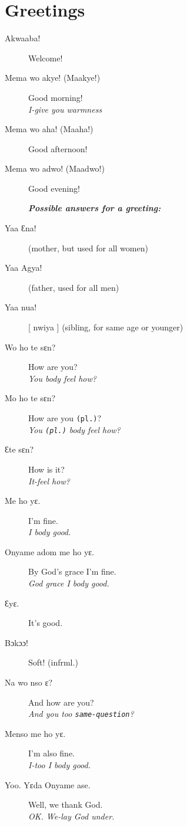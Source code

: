 \documentclass[%
 fontsize=11pt,%
 a5paper,pagesize,
 paper=a5,%
 DIV=9,%
 parskip=half*,%
 twoside=true,
 pointlessnumbers
]{scrbook}%
\begin{document}
\chapter{Greetings}

\begin{description}
  \item[Akwaaba!] Welcome! \\
  \item[Mema wo akye! (Maakye!)] Good morning! \\
    \textit{I-give you warmness}
  \item[Mema wo aha! (Maaha!)] Good afternoon!
  \item[Mema wo adwo! (Maadwo!)] Good evening!
  
  
  \textit{\textbf{Possible answers for a greeting:}}
  \item[Yaa Ɛna!] (mother, but used for all women)
  \item[Yaa Agya!] (father, used for all men)
  \item[Yaa nua!] [ nwiya ] (sibling, for same age or younger) \\
  
  
  
  \item[Wo ho te sɛn?] How are you? \\
    \textit{You body feel how?}
  \item[Mo ho te sɛn?] How are you \texttt{(pl.)}? \\
    \textit{You \texttt{(pl.)} body feel how?}
  \item[Ɛte sɛn?] How is it? \\
    \textit{It-feel how?}
  \item[Me ho yɛ.] I'm fine. \\
    \textit{I body good.}
  \item[Onyame adom me ho yɛ.] By God's grace I'm fine. \\
    \textit{God grace I body good.}
  \item[Ɛyɛ.] It's good.
  \item[Bɔkɔɔ!] Soft! (infrml.)
  \item[Na wo nso ɛ?] And how are you? \\
    \textit{And you too \texttt{same-question}?}
  \item[Menso me ho yɛ.] I'm also fine. \\
    \textit{I-too I body good.}
  \item[Yoo. Yɛda Onyame ase.] Well, we thank God. \\
    \textit{OK. We-lay God under.}
  

\end{description}
\end{document}
